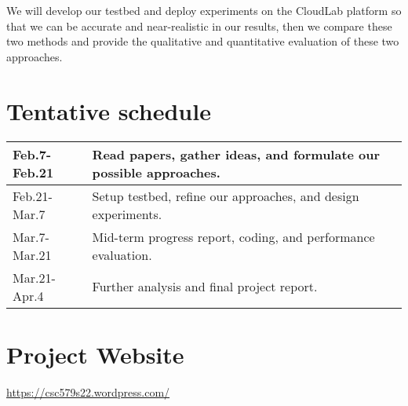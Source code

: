 \documentclass{article}
\begin{document}
We will develop our testbed and deploy experiments on the CloudLab platform \cite{Ricci2014IntroducingCS} so that we can be accurate and near-realistic in our results, then we compare these two methods and provide the qualitative and quantitative evaluation of these two approaches.

\section{Tentative schedule}
\begin{tabular}{|p{3cm}|p{10cm}|}
    \hline
    Feb.7-Feb.21 & Read papers, gather ideas, and formulate our possible approaches. \\
    \hline
    Feb.21-Mar.7 & Setup testbed, refine our approaches, and design experiments. \\
    \hline
    Mar.7-Mar.21 & Mid-term progress report, coding, and performance evaluation. \\
    \hline
    Mar.21-Apr.4 & Further analysis and final project report.  \\
    \hline
\end{tabular}

\section{Project Website}
\href{https://csc579s22.wordpress.com/}{https://csc579s22.wordpress.com/}


\printbibliography
\end{document}
